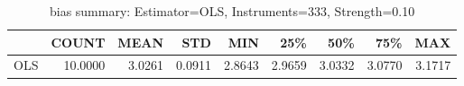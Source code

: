 \begin{table}[ht]
\centering
\caption{bias summary: Estimator=OLS, Instruments=333, Strength=0.10}
\begin{tabular}{lrrrrrrrr}
\toprule
 & COUNT & MEAN & STD & MIN & 25\% & 50\% & 75\% & MAX \\
\midrule
OLS & 10.0000 & 3.0261 & 0.0911 & 2.8643 & 2.9659 & 3.0332 & 3.0770 & 3.1717 \\
\bottomrule
\end{tabular}
\end{table}
